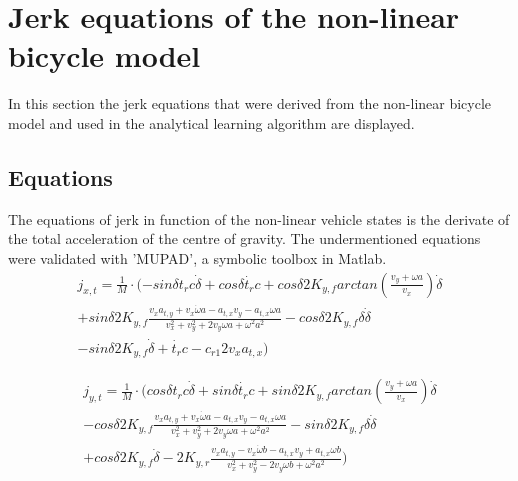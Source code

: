 \chapter{Jerk equations of the non-linear bicycle model}
\label{app:A}

In this section the jerk equations that were derived from the non-linear bicycle model and used in the analytical learning algorithm are displayed.
\section{Equations}
The equations of jerk in function of the non-linear vehicle states is the derivate of the total acceleration of the centre of gravity. The undermentioned equations were validated with 'MUPAD', a symbolic toolbox in Matlab.
\begin{multline*}
j_{x,t} = \frac{1}{M}\cdot (-sin\delta t_r c \dot{\delta}+ cos \delta\dot{t_r}c 
+ cos\delta 2 K_{y,f}arctan(\frac{v_y+\omega a}{v_x})\dot{\delta}\\ 
+ sin \delta 2 K_{y,f} \frac{v_x a_{t,y} + v_x \dot{\omega}a - a_{t,x}v_y -a_{t,x}\omega a}{v_x^2 +v_y^2 + 2v_y \omega a + \omega ^2 a^2 }
-cos \delta 2 K_{y,f}\delta \dot{\delta}\\
- sin\delta 2 K_{y,f} \dot{\delta} + \dot{t_r}c - c_{r1}2v_x a_{t,x})
\end{multline*}

\begin{multline*}
j_{y,t} = \frac{1}{M}\cdot (cos\delta t_r c \dot{\delta} + sin \delta \dot{t_r}c + sin\delta 2 K_{y,f}arctan(\frac{v_y+\omega a}{v_x})\dot{\delta}\\
-cos \delta 2 K_{y,f}\frac{v_x a_{t,y} + v_x \dot{\omega}a - a_{t,x}v_y -a_{t,x}\omega a}{v_x^2 +v_y^2 + 2v_y \omega a + \omega ^2 a^2 } - sin \delta 2 K_{y,f}\delta \dot{\delta}\\
 + cos\delta 2 K_{y,f}\dot{\delta} -2 K_{y,r} \frac{v_x a_{t,y} -v_x \dot{\omega}b - a_{t,x}v_y +a_{t,x}\omega b}{v_x^2 +v_y^2 - 2v_y \omega b + \omega ^2 a^2 })
\end{multline*}



%
%
%
%

